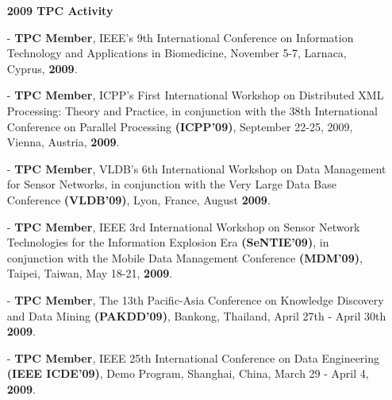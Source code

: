 \documentclass[10pt]{article}
\begin{document}
\begin{itemize}
\begin{itemize}
%
\vspace{0.1in}
\item[]{\bf 2009 TPC Activity\hrulefill }
%
\item[-] {\bf TPC Member}, IEEE's 9th International Conference on Information Technology and Applications in Biomedicine, November 5-7, Larnaca, Cyprus, {\bf 2009}.
\item[-] {\bf TPC Member}, ICPP's First International Workshop on Distributed XML Processing: Theory and Practice, in conjunction with the 38th International Conference on Parallel Processing {\bf (ICPP'09)}, September 22-25, 2009, Vienna, Austria, {\bf 2009}.
\item[-] {\bf TPC Member}, VLDB's 6th International Workshop on Data Management for Sensor Networks, in conjunction with the Very Large Data Base Conference {\bf (VLDB'09)}, Lyon, France, August {\bf 2009}.
\item[-] {\bf TPC Member}, IEEE 3rd International Workshop on Sensor Network Technologies for the Information Explosion Era {\bf (SeNTIE'09)}, in conjunction with the Mobile Data Management Conference {\bf (MDM'09)}, Taipei, Taiwan, May 18-21, {\bf 2009}.
\item[-] {\bf TPC Member}, The 13th Pacific-Asia Conference on Knowledge Discovery and Data Mining {\bf (PAKDD'09)}, Bankong, Thailand, April 27th - April 30th {\bf 2009}.
\item[-] {\bf TPC Member}, IEEE 25th International Conference on Data Engineering {\bf (IEEE ICDE'09)}, Demo Program, Shanghai, China, March 29 - April 4, {\bf 2009}.


\end{itemize}
\end{itemize}
\end{document}
